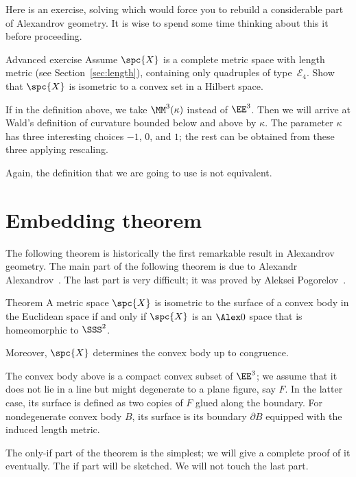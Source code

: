 Here is an exercise, solving which would force you to rebuild a considerable part of Alexandrov geometry.
It is wise to spend some time thinking about this it before proceeding.

\begin{thm}{Advanced exercise}\label{ex:convex-set}
Assume $\spc{X}$ is a complete metric space with length metric (see Section~\ref{sec:length}), 
containing only quadruples of type~$\mathcal{E}_4$.
Show that $\spc{X}$ is isometric to a convex set in a Hilbert space.
\end{thm}

If in the definition above, we take $\MM^3(\kappa)$ instead of $\EE^3$.
Then we will arrive at Wald's definition of curvature bounded below and above by $\kappa$.
The parameter $\kappa$ has three interesting choices $-1$, $0$, and $1$;
the rest can be obtained from these three applying rescaling.

Again, the definition that we are going to use is not equivalent.


\section{Embedding theorem}

The following theorem is historically the first remarkable result in Alexandrov geometry.
The main part of the following theorem is due to Alexandr Alexandrov~\cite{alexandrov-1948}.
The last part is very difficult; it was proved by Aleksei Pogorelov~\cite{pogorelov}.

\begin{thm}{Theorem}\label{thm:alexandrov+pogorelov}
A metric space $\spc{X}$ is isometric to the surface of a convex body in the Euclidean space if and only if $\spc{X}$ is an $\Alex0$ space that is homeomorphic to $\SSS^2$.

Moreover, $\spc{X}$ determines the convex body up to congruence.
\end{thm}

The convex body above is a compact convex subset of $\EE^3$;
we assume that it does not lie in a line but might degenerate to a plane figure, say $F$.
In the latter case, its surface is defined as two copies of $F$ glued along the boundary.
For nondegenerate convex body $B$, its surface is its boundary $\partial B$ equipped with the induced length metric. 

The only-if part of the theorem is the simplest; we will give a complete proof of it eventually.
The if part will be sketched.
We will not touch the last part.
